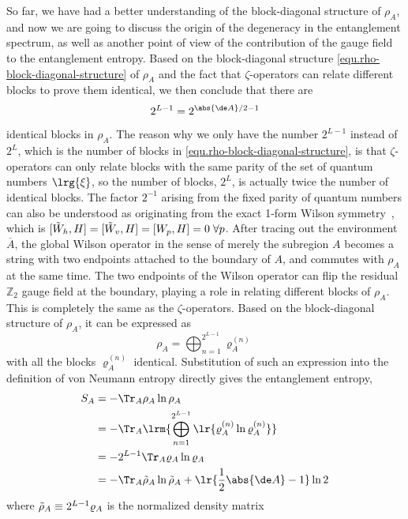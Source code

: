 So far, we have had a better understanding of the block-diagonal structure of $\rho_A$, and now we are going to discuss the origin of the degeneracy in the entanglement spectrum, as well as another point of view of the contribution of the gauge field to the entanglement entropy. Based on the block-diagonal structure \eqref{equ.rho-block-diagonal-structure} of $\rho_A$ and the fact that $\zeta$-operators can relate different blocks to prove them identical, we then conclude that there are 
\[2^{L-1} = 2^{\abs{\de A}/2 - 1}\] 
identical blocks in $\rho_A$. The reason why we only have the number $2^{L-1}$ instead of $2^L$, which is the number of blocks in \eqref{equ.rho-block-diagonal-structure}, is that $\zeta$-operators can only relate blocks with the same parity of the set of quantum numbers $\lrg{\xi}$, so the number of blocks, $2^L$, is actually twice the number of identical blocks. The factor $2^{-1}$ arising from the fixed parity of quantum numbers can also be understood as originating from the exact 1-form Wilson symmetry~\cite{PRX-ent-high}, which is $[\Tilde{W}_h,H] = [\Tilde{W}_v,H] = [W_p,H]=0\;\forall p$. After tracing out the environment $\overline{A}$, the global Wilson operator in the sense of merely the subregion $A$ becomes a string with two endpoints attached to the boundary of $A$, and commutes with $\rho_A$ at the same time. The two endpoints of the Wilson operator can flip the residual $\mathbb{Z}_2$ gauge field at the boundary, playing a role in relating different blocks of $\rho_A$. This is completely the same as the $\zeta$-operators. Based on the block-diagonal structure of $\rho_A$, it can be expressed as
\begin{equation}\label{equ.block-rho-final}
    \rho_A = \bigoplus_{n=1}^{2^{L-1}}\varrho^{(n)}_A
\end{equation}
with all the blocks $\varrho_A^{(n)}$ identical. Substitution of such an expression into the definition of von Neumann entropy directly gives the entanglement entropy, 
\begin{align}\label{equ.EE-from-blocks}
    S_A 
    &= -\Tr_A\rho_A\ln\rho_A \nonumber \\
    &= -\Tr_A\lrm{\bigoplus_{n=1}^{2^{L-1}}\lr{\varrho^{(n)}_A \ln \varrho^{(n)}_A}} \nonumber \\
    &= -2^{L-1}\Tr_A\varrho_A \ln \varrho_A \nonumber \\
    &= -\Tr_A\Tilde{\rho}_A\ln\Tilde{\rho}_A + \lr{\frac{1}{2}\abs{\de A} -  1}\ln 2
\end{align}
where $\Tilde{\rho}_A \equiv 2^{L-1}\varrho_A$ is the normalized density matrix
